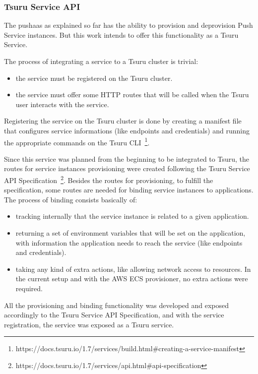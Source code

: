 \subsubsection{Tsuru Service API}

The pushaas as explained so far has the ability to provision and deprovision Push Service instances. But this work intends to offer this functionality as a Tsuru Service.

The process of integrating a service to a Tsuru cluster is trivial:
\begin{itemize}
    \item the service must be registered on the Tsuru cluster.
    \item the service must offer some HTTP routes that will be called when the Tsuru user interacts with the service.
\end{itemize}

Registering the service on the Tsuru cluster is done by creating a manifest file that configures service informations (like endpoints and credentials) and running the appropriate commands on the Tsuru CLI~\footnote{https://docs.tsuru.io/1.7/services/build.html\#creating-a-service-manifest}.

Since this service was planned from the beginning to be integrated to Tsuru, the routes for service instances provisioning were created following the Tsuru Service API Specification~\footnote{https://docs.tsuru.io/1.7/services/api.html#api-specification}. Besides the routes for provisioning, to fulfill the specification, some routes are needed for binding service instances to applications. The process of binding consists basically of:
\begin{itemize}
    \item tracking internally that the service instance is related to a given application.
    \item returning a set of environment variables that will be set on the application, with information the application needs to reach the service (like endpoints and credentials).
    \item taking any kind of extra actions, like allowing network access to resources. In the current setup and with the AWS ECS provisioner, no extra actions were required.
\end{itemize}

All the provisioning and binding functionality was developed and exposed accordingly to the Tsuru Service API Specification, and with the service registration, the service was exposed as a Tsuru service.


